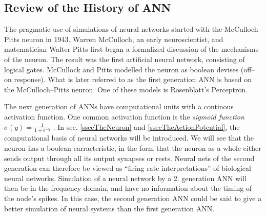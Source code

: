 \subsection{Review of the History of ANN}
\label{ssecHistoryOfANN}
The pragmatic use of simulations of neural networks started with the McCulloch--Pitts neuron in 1943. 
Warren McCulloch, an early neuroscientist, and matematician Walter Pitts first began a formalized discussion of the mechanisms of the neuron.
The result was the first artificial neural network, consisting of logical gates. McCullock and Pitts modelled the neuron as boolean devises (off--on response)\cite{MccullochPittsHistorie}. 
What is later referred to as the first generation ANN is based on the McCulloch--Pitts neuron\cite{Maass97networksof}.
One of these models is Rosenblatt's Perceptron\cite{HaykinANNbok}.

The next generation of ANNs have computational units with a continous activation function. 
One common activation function is the \emph{sigmoid function} $\sigma(y)=\frac{1}{1+e^{-y}}$ \cite{HaykinANNbok}.
In sec. \ref{ssecTheNeuron} and \ref{ssecTheActionPotential}, the computational basis of neural networks will be introduced. 
We will see that the neuron has a boolean carracteristic, in the form that the neuron as a whole either sends output through all its output synapses or rests. 
%
Neural nets of the second generation can therefore be viewed as ``firing rate interpretations'' of biological neural networks\cite{Maass97networksof}.
Simulation of a neural network by a 2. generation ANN will then be in the frequency domain, and have no information about the timing of the node's spikes. %
In this case, the second generation ANN could be said to give a better simulation of neural systems than the first generation ANN.  %




